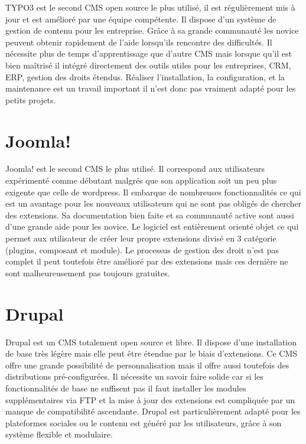 \documentclass[a4paper,12pt]{report}
\begin{document}
TYPO3 est le second CMS open source le plus utilisé, il est
régulièrement mis à jour et est amélioré par une équipe compétente. Il
dispose d'un système de gestion de contenu pour les entreprise.  Grâce
à sa grande communauté les novice peuvent obtenir rapidement de l'aide
lorsqu'ils rencontre des difficultés.  Il nécessite plus de temps
d'apprentissage que d'autre CMS mais lorsque qu'il est bien maîtrisé
il intégré directement des outils utiles pour les entreprises, CRM,
ERP, gestion des droits étendus.  Réaliser l’installation, la
configuration, et la maintenance est un travail important il n'est
donc pas vraiment adapté pour les petits projets.


\section{Joomla!}

Joomla! est le second CMS le plus utilisé. Il correspond aux
utilisateurs expérimenté comme débutant malgrés que son application
soit un peu plus exigente que celle de wordpress. Il embarque de
nombreuses fonctionnalités ce qui est un avantage pour les nouveaux
utilisateurs qui ne sont pas obligés de chercher des extensions. Sa
documentation bien faite et sa communauté active sont aussi d'une
grande aide pour les novice.  Le logiciel est entièrement orienté
objet ce qui permet aux utilisateur de créer leur propre extensions
divisé en 3 catégorie (plugins, composant et module).  Le processus de
gestion des droit n'est pas complet il peut toutefois être amélioré
par des extensions mais ces dernière ne sont malheureusement pas
toujours gratuites.

\section{Drupal}

Drupal est un CMS totalement open source et libre. Il dispose d'une
installation de base très légère mais elle peut être étendue par le
biais d’extensions. Ce CMS offre une grande possibilité de
personnalisation mais il offre aussi toutefois des distributions
pré-configurées.  Il nécessite un savoir faire solide car si les
fonctionnalités de base ne suffisent pas il faut installer les modules
supplémentaires via FTP et la mise à jour des extensions est
compliquée par un manque de compatibilité ascendante.  Drupal est
particulièrement adapté pour les plateformes sociales ou le contenu
est généré par les utilisateurs, grâce à son système flexible et
modulaire.
\end{document}
